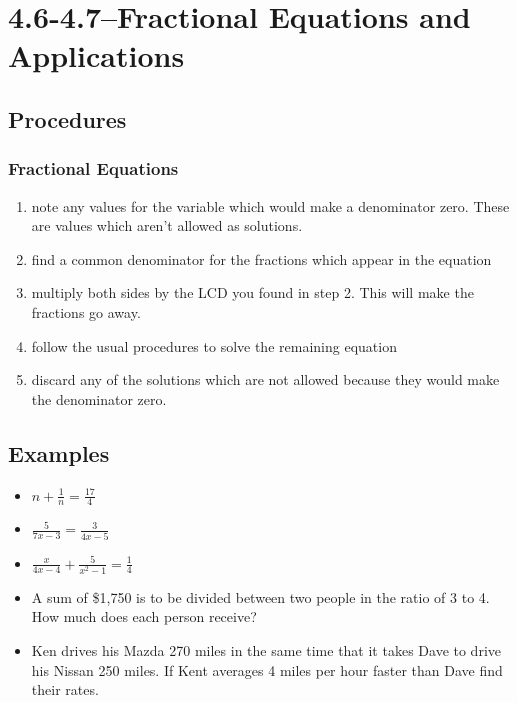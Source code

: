 \documentclass[fleqn,addpoints]{exam}
\begin{document}
\section{4.6-4.7--Fractional Equations and Applications}

\subsection{Procedures}

\subsubsection{Fractional Equations}

\begin{enumerate}
  \item note any values for the variable which would make a denominator zero.  These are values which aren't allowed as solutions.
  \item find a common denominator for the fractions which appear in the equation
  \item multiply both sides by the LCD you found in step 2.  This will make the fractions go away.
  \item follow the usual procedures to solve the remaining equation
  \item discard any of the solutions which are not allowed because they would make the denominator zero.
\end{enumerate}

\subsection{Examples}

\begin{itemize}
  \item \( \displaystyle n + \frac{1}{n} = \frac{17}{4} \)
  \item \( \displaystyle \frac{5}{7x-3} = \frac{3}{4x-5} \)
  \item \( \displaystyle \frac{x}{4x-4} + \frac{5}{x^2 - 1} = \frac{1}{4} \)
  \item A sum of \$1,750 is to be divided between two people in the ratio of 3 to 4.  How much does each person receive?
  \item Ken drives his Mazda 270 miles in the same time that it takes Dave to drive his Nissan 250 miles.  If Kent
    averages 4 miles per hour faster than Dave find their rates.
\end{itemize}
\end{document}

